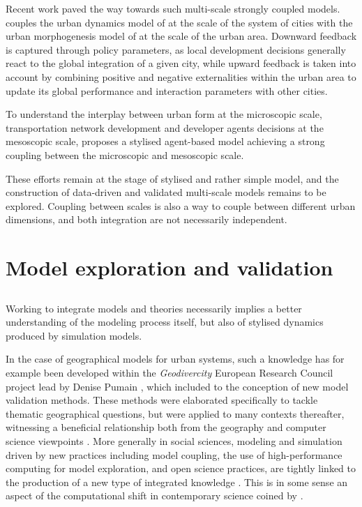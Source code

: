 Recent work paved the way towards such multi-scale strongly coupled models. \cite{raimbault2021strong} couples the urban dynamics model of \cite{raimbault2020indirect} at the scale of the system of cities with the urban morphogenesis model of \cite{raimbault2018calibration} at the scale of the urban area. Downward feedback is captured through policy parameters, as local development decisions generally react to the global integration of a given city, while upward feedback is taken into account by combining positive and negative externalities within the urban area to update its global performance and interaction parameters with other cities.

To understand the interplay between urban form at the microscopic scale, transportation network development and developer agents decisions at the mesoscopic scale, \cite{raimbault2021multiscale} proposes a stylised agent-based model achieving a strong coupling between the microscopic and mesoscopic scale.

These efforts remain at the stage of stylised and rather simple model, and the construction of data-driven and validated multi-scale models remains to be explored. Coupling between scales is also a way to couple between different urban dimensions, and both integration are not necessarily independent.


\section{Model exploration and validation}



\subsection{}

Working to integrate models and theories necessarily implies a better understanding of the modeling process itself, but also of stylised dynamics produced by simulation models. %

In the case of geographical models for urban systems, such a knowledge has for example been developed within the \emph{Geodivercity} European Research Council project lead by Denise Pumain \cite{pumain2017urban}, which included to the conception of new model validation methods. These methods were elaborated specifically to tackle thematic geographical questions, but were applied to many contexts thereafter, witnessing a beneficial relationship both from the geography and computer science viewpoints \cite{raimbault2019methods}. More generally in social sciences, modeling and simulation driven by new practices including model coupling, the use of high-performance computing for model exploration, and open science practices, are tightly linked to the production of a new type of integrated knowledge \cite{banos2013pour}. This is in some sense an aspect of the computational shift in contemporary science coined by \cite{arthur2014complexity}.


